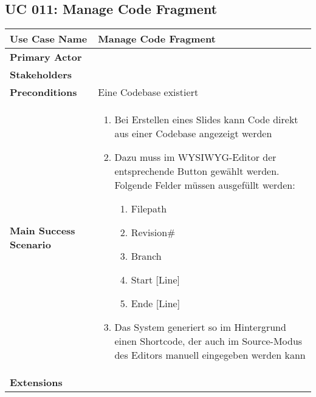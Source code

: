 \subsection{UC 011: Manage Code Fragment}
\label{uc:011-manage-code-frag}

\begin{tabular}{|l|p{}|}
\hline
\textbf{Use Case Name} 	&	Manage Code Fragment	\\ \hline
\textbf{Primary Actor} 	&		\\ \hline
\textbf{Stakeholders}	&		\\ \hline
\textbf{Preconditions}	&	Eine Codebase existiert	\\ \hline
\textbf{Main Success Scenario}	&
\begin{enumerate}
	\item Bei Erstellen eines Slides kann Code direkt aus einer Codebase angezeigt werden
	\item Dazu muss im WYSIWYG-Editor der entsprechende Button gewählt werden. Folgende Felder müssen ausgefüllt werden:
	\begin{enumerate}
	    \item Filepath
	    \item Revision\#
	    \item Branch
	    \item Start [Line]
	    \item Ende [Line]
	\end{enumerate}
	\item Das System generiert so im Hintergrund einen Shortcode, der auch im Source-Modus des Editors manuell eingegeben werden kann
\end{enumerate}
\\ \hline
\textbf{Extensions}	& 	\\ \hline
\end{tabular}